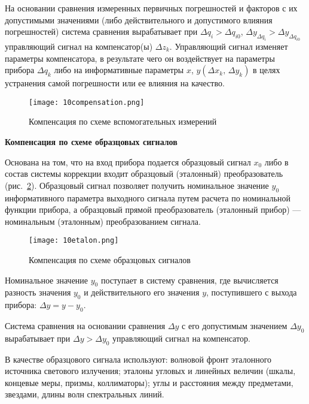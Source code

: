 На основании сравнения измеренных первичных погрешностей и факторов с их допустимыми значениями (либо действительного и допустимого влияния погрешностей) система сравнения вырабатывает при $ \Delta q_i > \Delta q_{i0} $, $ \Delta y_{\Delta q_i} > \Delta y_{\Delta q_{i0}} $ управляющий сигнал на компенсатор(ы) $ \Delta z_k $. Управляющий сигнал изменяет параметры компенсатора, в результате чего он воздействует на параметры прибора $ \Delta q_k $ либо на информативные параметры $ x $, $ y(\Delta x_k,\, \Delta y_k ) $ в целях устранения самой погрешности или ее влияния на качество.

\begin{figure}[h!]
	\caption{ Компенсация по схеме вспомогательных измерений }
	\texttt{[image: 10compensation.png]}
	\label{pic:10compensation}
\end{figure}

\begin{flushleft}
	\textbf{Компенсация по схеме образцовых сигналов}
\end{flushleft}

Основана на том, что на вход прибора подается образцовый сигнал $ x_0 $ либо в состав системы коррекции входит образцовый (эталонный) преобразователь (рис.~\ref{pic:10etalon}). Образцовый сигнал позволяет получить номинальное значение $ y_0 $ информативного параметра выходного сигнала путем расчета по номинальной функции прибора, а образцовый прямой преобразователь (эталонный прибор) --- номинальным (эталонным) преобразованием сигнала.

\begin{figure}[h!]
	\caption{ Компенсация по схеме образцовых сигналов }
	\texttt{[image: 10etalon.png]}
	\label{pic:10etalon}
\end{figure}

Номинальное значение $ y_0 $ поступает в систему сравнения, где вычисляется разность значения $ y_0 $ и действительного его значения $ y $, поступившего с выхода прибора: $ \Delta y = y - y_0 $.

Система сравнения на основании сравнения $ \Delta y $ с его допустимым значением $ \Delta y_0 $ вырабатывает при $ \Delta y > \Delta y_0 $ управляющий сигнал на компенсатор.

В качестве образцового сигнала используют: волновой фронт эталонного источника светового излучения; эталоны угловых и линейных величин (шкалы, концевые меры, призмы, коллиматоры); углы и расстояния между предметами, звездами, длины волн спектральных линий.

